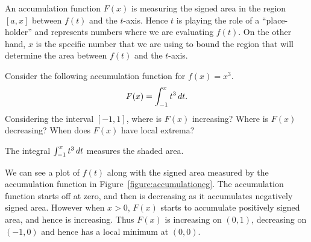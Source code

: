 \documentclass{ximera}
\begin{document}
An accumulation function $F(x)$ is measuring the signed area in the
region $[a,x]$ between $f(t)$ and the $t$-axis. Hence $t$ is playing
the role of a ``place-holder'' and represents numbers where we are
evaluating $f(t)$. On the other hand, $x$ is the specific number that
we are using to bound the region that will determine the area between
$f(t)$ and the $t$-axis.


\begin{example} 
Consider the following accumulation function for $f(x) = x^3$.
\[
F(x) = \int_{-1}^x t^3 \,d t.
\]
Considering the interval $[-1,1]$, where is $F(x)$ increasing? Where
is $F(x)$ decreasing? When does $F(x)$ have local extrema?
\end{example}

\begin{marginfigure}[-3in]
\caption{The integral $\int_{-1}^x t^3 \,d t$ measures the shaded area.}
\label{figure:accumulationeg}
\end{marginfigure}

\begin{solution}
We can see a plot of $f(t)$ along with the signed area measured by the
accumulation function in Figure~\ref{figure:accumulationeg}. The
accumulation function starts off at zero, and then is decreasing as it
accumulates negatively signed area. However when $x>0$, $F(x)$ starts
to accumulate positively signed area, and hence is increasing. Thus
$F(x)$ is increasing on $(0,1)$, decreasing on $(-1,0)$ and hence has
a local minimum at $(0,0)$.
\end{solution}
\end{document}
